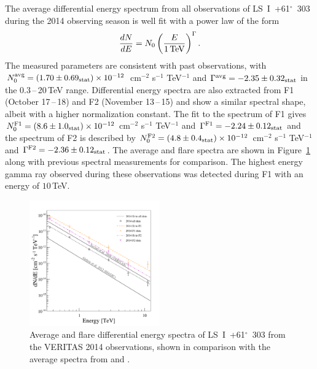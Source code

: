 \documentclass[preprint2]{aastex}
\newcommand{\tapp}{\raisebox{0.5ex}{\texttildelow}}
\newcommand{\lsi}{LS~I~+61$^{\circ}$~303}
\newcommand{\tev}{\,TeV}
\begin{document}
The average differential energy spectrum from all observations of \lsi{} during the 2014 observing season is well fit with a power law of the form
\begin{equation}
\frac{dN}{dE} = N_0 \left( \frac{E}{1\mbox{\tev{}}} \right)^{\Gamma}.
\end{equation}
The measured parameters are consistent with past observations, with $N_0^{\mbox{\scriptsize avg}} = \left( 1.70 \pm 0.69_{\mathrm{stat}} \right) \times 10^{-12}$ cm$^{-2}$ s$^{-1}$ TeV$^{-1}$ and $\Gamma^{\mbox{\scriptsize avg}} = -2.35 \pm 0.32_{\mathrm{stat}}$ in the 0.3\,--\,20\tev{} range. Differential energy spectra are also extracted from F1 (October 17\,--\,18)  and F2 (November 13\,--\,15) and show a similar spectral shape, albeit with a higher normalization constant. The fit to the spectrum of F1 gives $N_0^{\mbox{\scriptsize F1}} = \left( 8.6 \pm 1.0_{\mathrm{stat}} \right) \times 10^{-12}$ cm$^{-2}$ s$^{-1}$ TeV$^{-1}$ and $\Gamma^{\mbox{\scriptsize F1}} = -2.24 \pm 0.12_{\mathrm{stat}}$  and the spectrum of F2 is described by $N_0^{\mbox{\scriptsize F2}} = \left( 4.8 \pm 0.4_{\mathrm{stat}} \right) \times 10^{-12}$ cm$^{-2}$ s$^{-1}$ TeV$^{-1}$ and $\Gamma^{\mbox{\scriptsize F2}} = -2.36 \pm 0.12_{\mathrm{stat}}$. The average and flare spectra are shown in Figure~\ref{spec} along with previous spectral measurements for comparison. The highest energy gamma ray observed during these observations was detected during F1 with an energy of \tapp{}$10$\tev{}.

\begin{figure}[ht]
\centering
\includegraphics[width=0.5\textwidth]{figs/all_spectra_coloured.pdf}
\caption{Average and flare differential energy spectra of \lsi{} from the VERITAS 2014 observations, shown in comparison with the average spectra from \citet{VERITASLSIDetection} and \citet{Aleksic}.}
\label{spec}
\end{figure}
\end{document}
